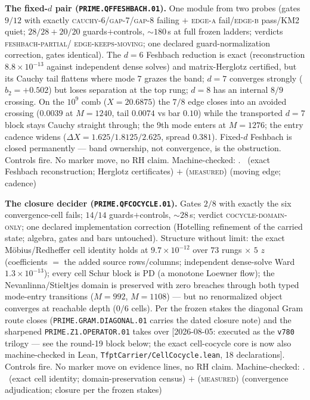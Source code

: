 \par\smallskip\noindent\textbf{The fixed-$d$ pair
(\texttt{PRIME.QFFESHBACH.01}).}
One module from two probes (gates $9/12$ with exactly
\textsc{cauchy-6}/\textsc{gap-7}/\textsc{gap-8} failing $+$
\textsc{edge-a} fail/\textsc{edge-b} pass/KM2 quiet;
$28/28+20/20$ guards$+$controls, ${\sim}180$\,s at full frozen
ladders; verdicts \textsc{feshbach-partial}/%
\textsc{edge-keeps-moving}; one declared guard-normalization
correction, gates identical).  The $d=6$ Feshbach reduction is
exact (reconstruction $8.8\times10^{-13}$ against independent
dense solves) and matrix-Herglotz certified, but its Cauchy tail
flattens where mode 7 grazes the band; $d=7$ converges strongly
($b_2=+0.502$) but loses separation at the top rung; $d=8$ has an
internal $8/9$ crossing.  On the $10^{9}$ comb ($X=20.6875$) the
$7/8$ edge closes into an avoided crossing ($0.0039$ at $M=1240$,
tail $0.0074$ vs bar $0.10$) while the transported $d=7$ block
stays Cauchy straight through; the 9th mode enters at $M=1276$;
the entry cadence widens ($\Delta X = 1.625/1.8125/2.625$, spread
$0.381$).  Fixed-$d$ Feshbach is closed permanently --- band
ownership, not convergence, is the obstruction.  Controls fire.
No marker move, no RH claim.
Machine-checked: .
\mE\ (exact Feshbach reconstruction; Herglotz certificates) $+$
(\textsc{measured}) (moving edge; cadence)
\par\smallskip


\par\smallskip\noindent\textbf{The closure decider
(\texttt{PRIME.QFCOCYCLE.01}).}
Gates $2/8$ with exactly the six convergence-cell fails; $14/14$
guards$+$controls, ${\sim}28$\,s; verdict
\textsc{cocycle-domain-only}; one declared implementation
correction (Hotelling refinement of the carried state; algebra,
gates and bars untouched).  Structure without limit: the exact
M\"obius/Redheffer cell identity holds at $9.7\times10^{-12}$ over
$73$ rungs $\times$ $5$ $z$ (coefficients $=$ the added source
rows/columns; independent dense-solve Ward $1.3\times10^{-13}$);
every cell Schur block is PD (a monotone Loewner flow); the
Nevanlinna/Stieltjes domain is preserved with zero breaches
through both typed mode-entry transitions ($M=992$, $M=1108$) ---
but no renormalized object converges at reachable depth ($0/6$
cells).  Per the frozen stakes the diagonal Gram route closes
(\texttt{PRIME.GRAM.DIAGONAL.01} carries the dated closure note)
and the sharpened \texttt{PRIME.Z1.OPERATOR.01} takes over
[2026-08-05: executed as the \texttt{v780} trilogy --- see the
round-19 block below; the exact cell-cocycle core is now also
machine-checked in Lean, \texttt{TfptCarrier/CellCocycle.lean},
18 declarations].
Controls fire.  No marker move on evidence lines, no RH claim.
Machine-checked: .
\mE\ (exact cell identity; domain-preservation census) $+$
(\textsc{measured}) (convergence adjudication; closure per the
frozen stakes)
\par\smallskip


